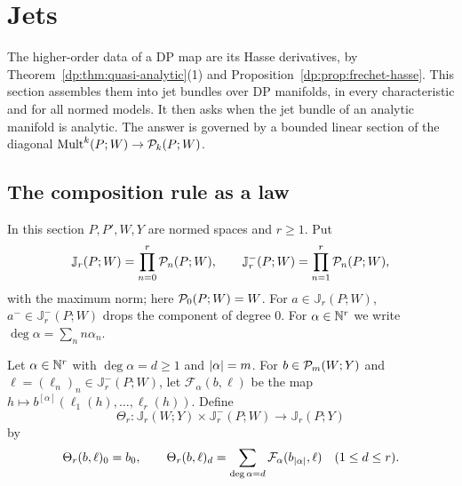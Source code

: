\section{Jets}\label{dp:sec:jets}

The higher-order data of a DP map are its Hasse derivatives, by Theorem~\ref{dp:thm:quasi-analytic}(1) and Proposition~\ref{dp:prop:frechet-hasse}. This section assembles them into jet bundles over DP manifolds, in every characteristic and for all normed models. It then asks when the jet bundle of an analytic manifold is analytic. The answer is governed by a bounded linear section of the diagonal $\operatorname{Mult}^k(P;W)\to\mathcal P_k(P;W)$.

\subsection{The composition rule as a law}\label{dp:ssec:chain-law}

In this section $P,P',W,Y$ are normed spaces and $r\ge1$. Put
\[
 \mathbb J_r(P;W)=\prod_{n=0}^r\mathcal P_n(P;W),\qquad \mathbb J^-_r(P;W)=\prod_{n=1}^r\mathcal P_n(P;W),
\]
with the maximum norm; here $\mathcal P_0(P;W)=W$. For $a\in\mathbb J_r(P;W)$, $a^-\in\mathbb J^-_r(P;W)$ drops the component of degree $0$. For $\alpha\in\mathbb N^r$ we write $\deg\alpha=\sum_nn\alpha_n$.

Let $\alpha\in\mathbb N^r$ with $\deg\alpha=d\ge1$ and $\lvert \alpha\rvert=m$. For $b\in\mathcal P_m(W;Y)$ and $\ell=(\ell_n)_n\in\mathbb J^-_r(P;W)$, let $\mathcal F_\alpha(b,\ell)$ be the map $h\mapsto b^{[\alpha]}(\ell_1(h),\dots,\ell_r(h))$. Define
\[
 \Theta_r\colon\mathbb J_r(W;Y)\times\mathbb J^-_r(P;W)\to\mathbb J_r(P;Y)
\]
by
\[
 \Theta_r(b,\ell)_0=b_0,\qquad\Theta_r(b,\ell)_d=\sum_{\deg\alpha=d}\mathcal F_\alpha(b_{\lvert \alpha\rvert},\ell)\quad(1\le d\le r).
\]

